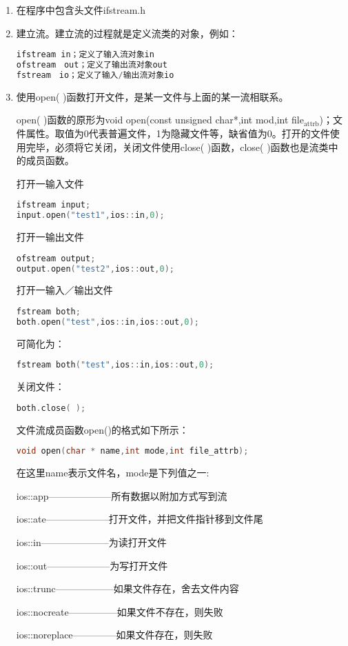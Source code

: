 \documentclass{article}
\begin{document}
\begin{enumerate}
\item 在程序中包含头文件ifstream.h
\label{sec-10-6-1-1}

\item 建立流。建立流的过程就是定义流类的对象，例如：
\label{sec-10-6-1-2}
\begin{lstlisting}[language=c++]
ifstream in；定义了输入流对象in
ofstream　out；定义了输出流对象out
fstream　io；定义了输入/输出流对象io
\end{lstlisting}
\item 使用open( )函数打开文件，是某一文件与上面的某一流相联系。
\label{sec-10-6-1-3}

open( )函数的原形为void open(const unsigned char*,int mod,int file$_{\text{attrb}}$)；文件属性。取值为0代表普遍文件，1为隐藏文件等，缺省值为0。打开的文件使用完毕，必须将它关闭，关闭文件使用close( )函数，close( )函数也是流类中的成员函数。 

打开一输入文件
\begin{lstlisting}[language=c++]
ifstream input;
input.open("test1",ios::in,0);
\end{lstlisting}

打开一输出文件
\begin{lstlisting}[language=c++]
ofstream output;
output.open("test2",ios::out,0);
\end{lstlisting}

打开一输入／输出文件
\begin{lstlisting}[language=c++]
fstream both;
both.open("test",ios::in,ios::out,0);
\end{lstlisting}

可简化为：
\begin{lstlisting}[language=c++]
fstream both("test",ios::in,ios::out,0);
\end{lstlisting}
关闭文件：
\begin{lstlisting}[language=c++]
both.close( );
\end{lstlisting}
文件流成员函数open()的格式如下所示：
\begin{lstlisting}[language=c++]
void open(char * name,int mode,int file_attrb);
\end{lstlisting}
在这里name表示文件名，mode是下列值之一:

ios::app--------------------所有数据以附加方式写到流

ios::ate--------------------打开文件，并把文件指针移到文件尾

ios::in---------------------为读打开文件

ios::out--------------------为写打开文件

ios::trunc------------------如果文件存在，舍去文件内容

ios::nocreate---------------如果文件不存在，则失败

ios::noreplace--------------如果文件存在，则失败
\end{enumerate}
\end{document}
